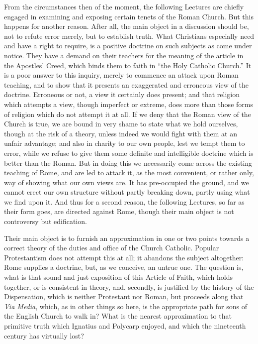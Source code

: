 From the circumstances then of the moment, the following Lectures
are chiefly engaged in examining and exposing certain tenets of the
Roman Church. But this happens for another reason. After all, the main
object in a discussion should be, not to refute error merely, but to
establish truth. What Christians especially need and have a right to
require, is a positive doctrine on such subjects as come under notice.
They have a demand on their teachers for the meaning of the article in
the Apostles' Creed, which binds them to faith in ``the Holy
Catholic Church.'' It is a poor answer to this inquiry, merely to
commence an attack upon Roman teaching, and to show that it presents
an exaggerated and erroneous view of the doctrine. Erroneous or not, a
view it certainly does present; and that religion which attempts a
view, though imperfect or extreme, does more than those forms of
religion which do not attempt it at all. If we deny that the Roman
view of the Church is true, we are bound in very shame to state what
we hold ourselves, though at the risk of a theory, unless indeed we
would fight with them at an unfair advantage; and also in charity to
our own people, lest we tempt them to error, while we refuse to give
them some definite and intelligible doctrine which is better than the
Roman. But in doing this we necessarily come across the existing
teaching of Rome, and are led to attack it, as the most convenient, or
rather only, way of showing what our own views are. It has
pre-occupied the ground, and we cannot erect our own structure without
partly breaking down, partly using what we find upon it. And thus for
a second reason, the following Lectures, so far as their form
goes, are directed against Rome, though their main object is not
controversy but edification.

Their main object is to furnish an approximation in one or two
points towards a correct theory of the duties and office of the Church
Catholic. Popular Protestantism does not attempt this at all; it
abandons the subject altogether: Rome supplies a doctrine, but, as we
conceive, an untrue one. The question is, what is that sound and just
exposition of this Article of Faith, which holds together, or is
consistent in theory, and, secondly, is justified by the history of
the Dispensation, which is neither Protestant nor Roman, but proceeds
along that \emph{Via Media}, which, as in other things so here, is the
appropriate path for sons of the English Church to walk in? What is
the nearest approximation to that primitive truth which Ignatius and
Polycarp enjoyed, and which the nineteenth century has virtually lost?

